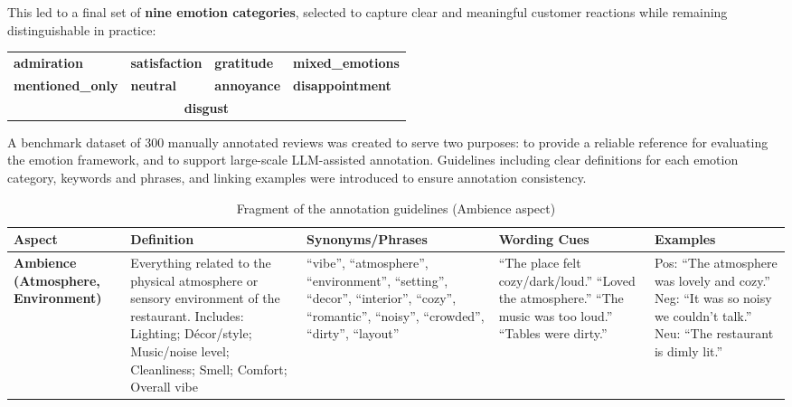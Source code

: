 \documentclass[10pt]{article}
\begin{document}
This led to a final set of \textbf{nine emotion categories}, selected to capture clear and meaningful customer reactions while remaining distinguishable in practice:

\begin{tcolorbox}[
  enhanced, colback=lightgray, colframe=medgray,
  arc=3pt, left=8pt, right=8pt, top=6pt, bottom=6pt
]
\begin{center}
\begin{tabular}{@{}llll@{}}
\textcolor{positive}{\textbf{admiration}} &
\textcolor{positive}{\textbf{satisfaction}} &
\textcolor{positive}{\textbf{gratitude}} &
\textbf{mixed\_emotions} \\[4pt]
\textbf{mentioned\_only} &
\textbf{neutral} &
\textcolor{negative}{\textbf{annoyance}} &
\textcolor{negative}{\textbf{disappointment}} \\[4pt]
\multicolumn{4}{c}{\textcolor{negative}{\textbf{disgust}}}
\end{tabular}
\end{center}
\end{tcolorbox}

A benchmark dataset of 300 manually annotated reviews was created to serve two purposes: to provide a reliable reference for evaluating the emotion framework, and to support large-scale LLM-assisted annotation. Guidelines including clear definitions for each emotion category, keywords and phrases, and linking examples were introduced to ensure annotation consistency.

\begin{table}[H]
\centering
\caption{Fragment of the annotation guidelines (Ambience aspect)}
\small
\setlength{\tabcolsep}{6pt}
\begin{tabular}{>{\bfseries}p{2.4cm} p{3.2cm} p{2.8cm} p{2.8cm} p{3cm}}
\toprule
\rowcolor{primary!90!black}
\color{white}\textbf{Aspect} &
\color{white}\textbf{Definition} &
\color{white}\textbf{Synonyms/Phrases} &
\color{white}\textbf{Wording Cues} &
\color{white}\textbf{Examples} \\
\midrule
Ambience (Atmosphere, Environment) &
Everything related to the physical atmosphere or sensory environment of the restaurant. Includes: Lighting; Décor/style; Music/noise level; Cleanliness; Smell; Comfort; Overall vibe &
``vibe'', ``atmosphere'', ``environment'', ``setting'', ``decor'', ``interior'', ``cozy'', ``romantic'', ``noisy'', ``crowded'', ``dirty'', ``layout'' &
``The place felt cozy/dark/loud.'' ``Loved the atmosphere.'' ``The music was too loud.'' ``Tables were dirty.'' &
Pos: ``The atmosphere was lovely and cozy.'' Neg: ``It was so noisy we couldn't talk.'' Neu: ``The restaurant is dimly lit.'' \\
\bottomrule
\end{tabular}
\end{table}
\end{document}
